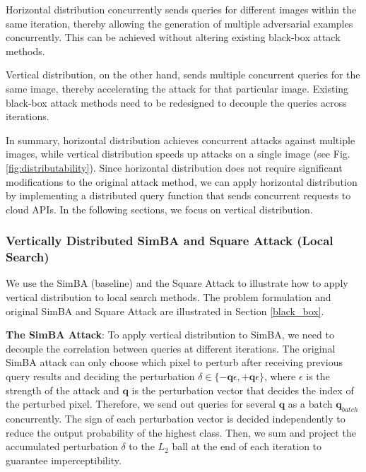 Horizontal distribution concurrently sends queries for different images within the same iteration, thereby allowing the generation of multiple adversarial examples concurrently. This can be achieved without altering existing black-box attack methods. 

Vertical distribution, on the other hand, sends multiple concurrent queries for the same image, thereby accelerating the attack for that particular image. Existing black-box attack methods need to be redesigned to decouple the queries across iterations.

In summary, horizontal distribution achieves concurrent attacks against multiple images, while vertical distribution speeds up attacks on a single image (see Fig. \ref{fig:distributability}). Since horizontal distribution does not require significant modifications to the original attack method, we can apply horizontal distribution by implementing a distributed query function that sends concurrent requests to cloud APIs. In the following sections, we focus on vertical distribution.


\subsubsection{Vertically Distributed SimBA and Square Attack (Local Search)}

We use the SimBA (baseline) \citep{guo2019simple} and the Square Attack \citep{andriushchenko2020square} to illustrate how to apply vertical distribution to local search methods. The problem formulation and original SimBA and Square Attack are illustrated in Section \ref{black_box}.

\textbf{The SimBA Attack}: To apply vertical distribution to SimBA, we need to decouple the correlation between queries at different iterations. The original SimBA attack can only choose which pixel to perturb after receiving previous query results and deciding the perturbation $\delta \in \{-\boldsymbol{q}\epsilon, +\boldsymbol{q}\epsilon\}$, where $\epsilon$ is the strength of the attack and $\boldsymbol{q}$ is the perturbation vector that decides the index of the perturbed pixel. Therefore, we send out queries for several $\boldsymbol{q}$ as a batch $\boldsymbol{q}_{batch}$ concurrently. The sign of each perturbation vector is decided independently to reduce the output probability of the highest class. Then, we sum and project the accumulated perturbation $\delta$ to the $L_2$ ball at the end of each iteration to guarantee imperceptibility.

